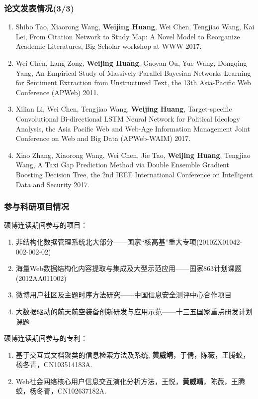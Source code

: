 \begin{frame}[plain]
\frametitle{论文发表情况(3/3)}

\footnotesize
\begin{enumerate}\addtocounter{enumi}{10}
\item Shibo Tao, Xiaorong Wang, \textbf{Weijing Huang}, Wei Chen, Tengjiao Wang, Kai Lei, From Citation Network to Study Map: A Novel Model to Reorganize Academic Literatures, Big Scholar workshop at WWW 2017.
\item Wei Chen, Lang Zong, \textbf{Weijing Huang}, Gaoyan Ou, Yue Wang, Dongqing Yang, An Empirical Study of Massively Parallel Bayesian Networks Learning for Sentiment Extraction from Unstructured Text, the 13th Asia-Pacific Web Conference (APWeb) 2011. 
\item Xilian Li, Wei Chen, Tengjiao Wang, \textbf{Weijing Huang}, Target-specific Convolutional Bi-directional LSTM Neural Network for Political Ideology Analysis, the Asia Pacific Web and Web-Age Information Management Joint Conference on Web and Big Data (APWeb-WAIM) 2017.
\item Xiao Zhang, Xiaorong Wang, Wei Chen, Jie Tao, \textbf{Weijing Huang}, Tengjiao Wang, A Taxi Gap Prediction Method via Double Ensemble Gradient Boosting Decision Tree, the 2nd IEEE International Conference on Intelligent Data and Security 2017.
\end{enumerate}
\end{frame}

\begin{frame}[plain]
\frametitle{参与科研项目情况}

硕博连读期间参与的项目：
\footnotesize
\begin{enumerate}
\item 非结构化数据管理系统北大部分——国家“核高基”重大专项(2010ZX01042-002-002-02)
\item 海量Web数据结构化内容提取与集成及大型示范应用——国家863计划课题(2012AA011002)
\item 微博用户社区及主题时序方法研究——中国信息安全测评中心合作项目
\item 大数据驱动的航天航空装备创新研发与应用示范——十三五国家重点研发计划课题
\end{enumerate}

\vfill

\normalsize
硕博连读期间参与的专利：
\footnotesize
\begin{enumerate}
\item 基于交互式文档聚类的信息检索方法及系统, \textbf{黄威靖}，于倩，陈薇，王腾蛟，杨冬青，CN103514183A.
\item Web社会网络核心用户信息交互演化分析方法，王悦，\textbf{黄威靖}，陈薇，王腾蛟，杨冬青，CN102637182A.
\end{enumerate}

\end{frame}


